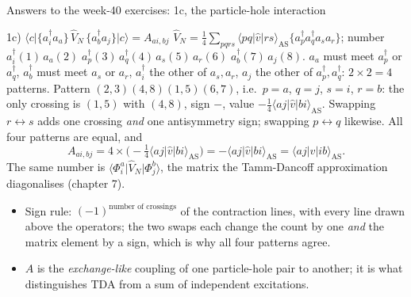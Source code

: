 \documentclass[aspectratio=169,10pt]{beamer}
\newcommand{\element}[3]{\langle #1\vert #2\vert #3\rangle}
\newcommand{\nc}[1]{\bigl\{#1\bigr\}}
\begin{document}
\begin{frame}{Answers to the week-40 exercises: 1c, the particle-hole interaction}
  \footnotesize
  \begin{block}{1c) $\element{c}{\nc{a_i^{\dagger}a_a}\,\hat V_N\,\nc{a_b^{\dagger}a_j}}{c}=A_{ai,bj}$}
    $\hat V_N=\frac14\sum_{pqrs}\element{pq}{\hat v}{rs}_{\mathrm{AS}}\nc{a_p^{\dagger}a_q^{\dagger}a_sa_r}$; number $a_i^{\dagger}(1)\,a_a(2)\;a_p^{\dagger}(3)\,a_q^{\dagger}(4)\,a_s(5)\,a_r(6)\;a_b^{\dagger}(7)\,a_j(8)$.
    $a_a$ must meet $a_p^{\dagger}$ or $a_q^{\dagger}$, $a_b^{\dagger}$ must meet $a_s$ or $a_r$, $a_i^{\dagger}$ the other of $a_s,a_r$, $a_j$ the other of $a_p^{\dagger},a_q^{\dagger}$: $2\times2=4$ patterns. Pattern $(2,3)(4,8)(1,5)(6,7)$, i.e.\ $p=a$, $q=j$, $s=i$, $r=b$: the only crossing is $(1,5)$ with $(4,8)$, sign $-$, value $-\frac14\element{aj}{\hat v}{bi}_{\mathrm{AS}}$. Swapping $r\leftrightarrow s$ adds one crossing \emph{and} one antisymmetry sign; swapping $p\leftrightarrow q$ likewise. All four patterns are equal, and
    \[
      A_{ai,bj}=4\times\bigl(-\tfrac14\element{aj}{\hat v}{bi}_{\mathrm{AS}}\bigr)=-\element{aj}{\hat v}{bi}_{\mathrm{AS}}=\element{aj}{\hat v}{ib}_{\mathrm{AS}}.
    \]
    The same number is $\element{\Phi_i^a}{\hat V_N}{\Phi_j^b}$, the matrix the Tamm-Dancoff approximation diagonalises (chapter 7).
  \end{block}
  \vspace{0.3em}
  \begin{itemize}
    \item Sign rule: $(-1)^{\text{number of crossings}}$ of the contraction lines, with every line drawn above the operators; the two swaps each change the count by one \emph{and} the matrix element by a sign, which is why all four patterns agree.
    \item $A$ is the \emph{exchange-like} coupling of one particle-hole pair to another; it is what distinguishes TDA from a sum of independent excitations.
  \end{itemize}
\end{frame}
\end{document}
